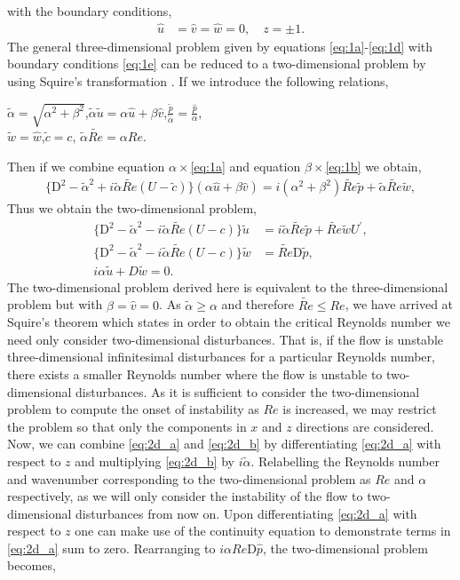 \documentclass[a4paper, 12pt, twoside, openright]{article}
\numberwithin{equation}{section}
\begin{document}
with the boundary conditions,
\begin{align}
\hat u &= \hat v = \hat w =0, \quad z=\pm1. \label{eq:1e}
\end{align}
The general three-dimensional problem given by equations \eqref{eq:1a}-\eqref{eq:1d} with boundary conditions \eqref{eq:1e} can be reduced to a two-dimensional problem by using Squire's transformation \citep{Squire33}. If we introduce the following relations,
\begin{center}
$\tilde\alpha = \sqrt{\alpha^2+\beta^2}$,\quad $\tilde\alpha\tilde u = \alpha\hat u + \beta \hat v$,\quad $\frac{\tilde p}{\tilde \alpha} = \frac{\hat p}{\alpha}$, \\
$\tilde w = \hat w$,\quad $\tilde c=c$, \quad $\tilde\alpha\widetilde{Re} = \alpha Re$.
\end{center}
Then if we combine equation $\alpha\times$\eqref{eq:1a} and equation $\beta\times$\eqref{eq:1b} we obtain,
\begin{align}
\{\mathrm{D}^2-\tilde\alpha^2+i\tilde\alpha\widetilde{Re} (U-\tilde c)\}(\alpha\hat u + \beta\hat v) = i(\alpha^2 + \beta^2)\widetilde{Re} \tilde p + \tilde \alpha\widetilde{Re}\tilde w,
\end{align} 
Thus we obtain the two-dimensional problem,
\begin{align}
\{ \mathrm{D}^2 - \tilde\alpha^2 - i\tilde\alpha \widetilde{Re} (U-c) \} \tilde u &= i \tilde\alpha \widetilde{Re}\tilde p + \widetilde{Re}\tilde wU^\prime, \label{eq:2d_a} \\
\{ \mathrm{D}^2 - \tilde\alpha^2 - i\tilde\alpha \widetilde{Re} (U-c) \} \tilde w &= \widetilde{Re} \mathrm{D}\tilde p,\label{eq:2d_b} \\
i\alpha\tilde u + D\tilde w = 0. \label{eq:2d_c} 
\end{align}
The two-dimensional problem derived here is equivalent to the three-dimensional problem but with $\beta=\hat v=0$. As $\tilde\alpha \ge \alpha$ and therefore $\widetilde{Re} \leq Re$, we have arrived at Squire's theorem which states in order to obtain the critical Reynolds number we need only consider two-dimensional disturbances. That is, if the flow is unstable three-dimensional infinitesimal disturbances for a particular Reynolds number, there exists a smaller Reynolds number where the flow is unstable to two-dimensional disturbances. As it is sufficient to consider the two-dimensional problem to compute the onset of instability as $Re$ is increased, we may restrict the problem so that only the components in $x$ and $z$ directions are considered. Now, we can combine \eqref{eq:2d_a} and \eqref{eq:2d_b} by differentiating \eqref{eq:2d_a} with respect to $z$ and multiplying \eqref{eq:2d_b} by $i\tilde\alpha$. Relabelling the Reynolds number and wavenumber corresponding to the two-dimensional problem as $Re$ and $\alpha$ respectively, as we will only consider the instability of the flow to two-dimensional disturbances from now on. Upon differentiating \eqref{eq:2d_a} with respect to $z$ one can make use of the continuity equation to demonstrate terms in \eqref{eq:2d_a} sum to zero. Rearranging to $i\alpha Re \mathrm{D}\hat p$, the two-dimensional problem becomes, 
\end{document}
